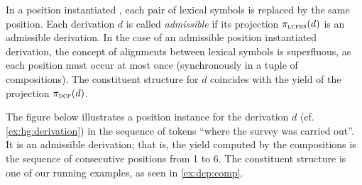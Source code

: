 \documentclass[../../document.tex]{subfiles}
\begin{document}
    In a position instantiated , each pair of lexical symbols is replaced by the same position.
    Each derivation \(d\) is called \emph{admissible} if its projection \(\pi_{\textsc{lcfrs}}(d)\) is an admissible  derivation.
    In the case of an admissible position instantiated derivation, the concept of alignments between lexical symbols is superfluous, as each position must occur at most once (synchronously in a tuple of compositions).
    The constituent structure for \(d\) coincides with the yield of the projection \(\pi_{\textsc{dcp}}(d)\).

    \vspace{\baselineskip}

    \parexample
    The figure below illustrates a position instance for the derivation \(d\) (cf.\@ \cref{ex:hg:derivation}) in the sequence of tokens ``where the survey was carried out''.
    It is an admissible derivation; that is, the yield computed by the  compositions is the sequence of consecutive positions from 1 to 6.
    The constituent structure is one of our running examples, as seen in \cref{ex:dcp:comp}.

    \null\hfill
    \hfill\exampleqed
\end{document}
